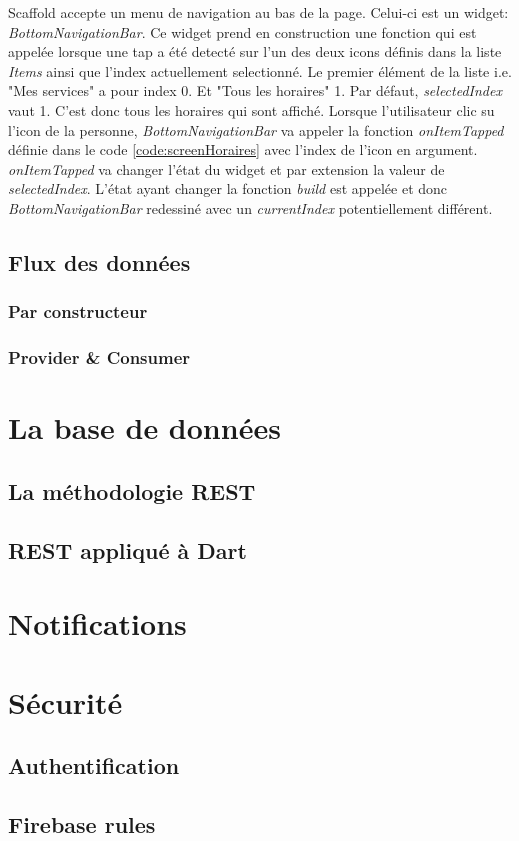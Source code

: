     Scaffold accepte un menu de navigation au bas de la page. Celui-ci est un widget: \textit{BottomNavigationBar}. Ce widget prend en construction
    une fonction qui est appelée lorsque une tap a été detecté sur l'un des deux icons définis dans la liste \textit{Items} ainsi que l'index actuellement 
    selectionné. Le premier élément de la liste i.e. "Mes services" a pour index 0. Et "Tous les horaires" 1. Par défaut, \textit{selectedIndex} vaut 1. C'est donc tous les 
    horaires qui sont affiché. Lorsque l'utilisateur clic su l'icon de la personne, \textit{BottomNavigationBar} va appeler la fonction \textit{onItemTapped} définie dans le code \ref{code:screenHoraires} avec
    l'index de l'icon en argument. \textit{onItemTapped} va changer l'état du widget et par extension la valeur de \textit{selectedIndex}. L'état ayant changer la fonction
    \textit{build} est appelée et donc \textit{BottomNavigationBar} redessiné avec un \textit{currentIndex} potentiellement différent. 

    \subsection{Flux des données}

        \subsubsection{Par constructeur}

        \subsubsection{Provider \& Consumer}


    \section{La base de données}
        \subsection{La méthodologie REST}
        \subsection{REST appliqué à Dart}

            
    \section{Notifications}


    
    \section{Sécurité}

        \subsection{Authentification}

        \subsection{Firebase rules}

